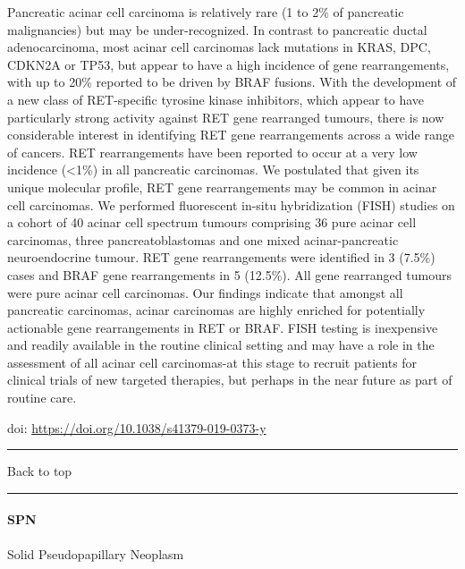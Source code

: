 \documentclass[
]{article}
\renewcommand{\linethickness}{0.05em}
\begin{document}
Pancreatic acinar cell carcinoma is relatively rare (1 to 2\% of
pancreatic malignancies) but may be under-recognized. In contrast to
pancreatic ductal adenocarcinoma, most acinar cell carcinomas lack
mutations in KRAS, DPC, CDKN2A or TP53, but appear to have a high
incidence of gene rearrangements, with up to 20\% reported to be driven
by BRAF fusions. With the development of a new class of RET-specific
tyrosine kinase inhibitors, which appear to have particularly strong
activity against RET gene rearranged tumours, there is now considerable
interest in identifying RET gene rearrangements across a wide range of
cancers. RET rearrangements have been reported to occur at a very low
incidence (\textless1\%) in all pancreatic carcinomas. We postulated
that given its unique molecular profile, RET gene rearrangements may be
common in acinar cell carcinomas. We performed fluorescent in-situ
hybridization (FISH) studies on a cohort of 40 acinar cell spectrum
tumours comprising 36 pure acinar cell carcinomas, three
pancreatoblastomas and one mixed acinar-pancreatic neuroendocrine
tumour. RET gene rearrangements were identified in 3 (7.5\%) cases and
BRAF gene rearrangements in 5 (12.5\%). All gene rearranged tumours were
pure acinar cell carcinomas. Our findings indicate that amongst all
pancreatic carcinomas, acinar carcinomas are highly enriched for
potentially actionable gene rearrangements in RET or BRAF. FISH testing
is inexpensive and readily available in the routine clinical setting and
may have a role in the assessment of all acinar cell carcinomas-at this
stage to recruit patients for clinical trials of new targeted therapies,
but perhaps in the near future as part of routine care.

doi: \url{https://doi.org/10.1038/s41379-019-0373-y}

\begin{center}\rule{0.5\linewidth}{\linethickness}\end{center}

Back to top

\begin{center}\rule{0.5\linewidth}{\linethickness}\end{center}

\pagebreak

\hypertarget{spn}{%
\paragraph{SPN}\label{spn}}

Solid Pseudopapillary Neoplasm
\end{document}
